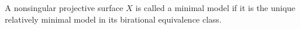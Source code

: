 A nonsingular projective surface $X$ is called a minimal model if it is the unique relatively minimal model in its birational equivalence class.
